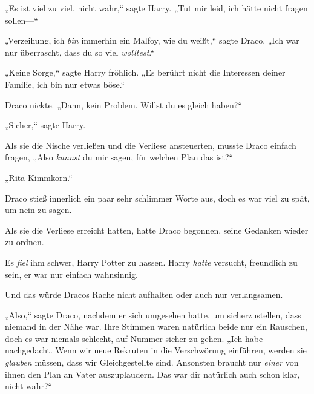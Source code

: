 „Es ist viel zu viel, nicht wahr,“ sagte Harry. „Tut mir leid, ich hätte nicht fragen sollen—“

„Verzeihung, ich \emph{bin} immerhin ein Malfoy, wie du weißt,“ sagte Draco. „Ich war nur überrascht, dass du so viel \emph{wolltest}.“

„Keine Sorge,“ sagte Harry fröhlich. „Es berührt nicht die Interessen deiner Familie, ich bin nur etwas böse.“

Draco nickte. „Dann, kein Problem. Willst du es gleich haben?“

„Sicher,“ sagte Harry.

Als sie die Nische verließen und die Verliese ansteuerten, musste Draco einfach fragen, „Also \emph{kannst} du mir sagen, für welchen Plan das ist?“

„Rita Kimmkorn.“

Draco stieß innerlich ein paar sehr schlimmer Worte aus, doch es war viel zu spät, um nein zu sagen.

\later

Als sie die Verliese erreicht hatten, hatte Draco begonnen, seine Gedanken wieder zu ordnen.

Es \emph{fiel} ihm schwer, Harry Potter zu hassen. Harry \emph{hatte} versucht, freundlich zu sein, er war nur einfach wahnsinnig.

Und das würde Dracos Rache nicht aufhalten oder auch nur verlangsamen.

„Also,“ sagte Draco, nachdem er sich umgesehen hatte, um sicherzustellen, dass niemand in der Nähe war. Ihre Stimmen waren natürlich beide nur ein Rauschen, doch es war niemals schlecht, auf Nummer sicher zu gehen. „Ich habe nachgedacht. Wenn wir neue Rekruten in die Verschwörung einführen, werden sie \emph{glauben} müssen, dass wir Gleichgestellte sind. Ansonsten braucht nur \emph{einer} von ihnen den Plan an Vater auszuplaudern. Das war dir natürlich auch schon klar, nicht wahr?“

